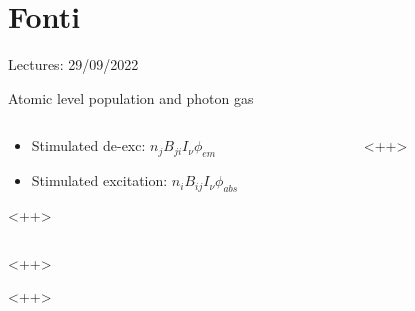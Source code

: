 \section{Fonti}

\begin{wordonframe}{Lectures: 29/09/2022}
    \begin{block}{Atomic level population and photon gas}
        \begin{columns}[T]
            \begin{column}{0.5\textwidth}
                \begin{itemize}
                    \item Stimulated de-exc: $n_jB_{ji}I_{\nu}\phi_{em}$
                    \item Stimulated excitation: $n_iB_{ij}I_{\nu}\phi_{abs}$
                \end{itemize}<++>
            \end{column}
            \begin{column}{0.5\textwidth}
                <++>
            \end{column}
        \end{columns}
        <++>
    \end{block}<++>

\end{wordonframe}


